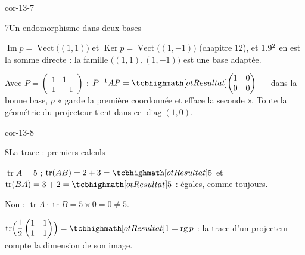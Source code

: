 \begin{blocLivre}{cor-13-7}
\begin{corrige}{7}{Un endomorphisme dans deux bases}
\begin{questions}
  \item $\operatorname{Im}p=\operatorname{Vect}\bigl((1,1)\bigr)$ et
    $\operatorname{Ker}p=\operatorname{Vect}\bigl((1,-1)\bigr)$
    (chapitre 12), et $1.9^{2}$ en est la somme directe : la famille
    $\bigl((1,1),(1,-1)\bigr)$ est une base adaptée.
  \item Avec $P=\begin{pmatrix}1&1\\1&-1\end{pmatrix}$ :
    $P^{-1}AP=\res{\begin{pmatrix}1&0\\0&0\end{pmatrix}}$ — dans la bonne
    base, $p$ « garde la première coordonnée et efface la seconde ». Toute
    la géométrie du projecteur tient dans ce $\operatorname{diag}(1,0)$.
\end{questions}
\end{corrige}
\end{blocLivre}

\begin{blocLivre}{cor-13-8}
\begin{corrige}{8}{La trace : premiers calculs}
\begin{questions}
  \item $\operatorname{tr}A=5$ ;
    $\operatorname{tr}(AB)=2+3=\res{5}$ et
    $\operatorname{tr}(BA)=3+2=\res{5}$ : égales, comme toujours.
  \item Non : $\operatorname{tr}A\cdot\operatorname{tr}B=5\times0=0\neq5$.
  \item $\operatorname{tr}\Bigl(\dfrac12\begin{pmatrix}1&1\\1&1\end{pmatrix}\Bigr)
    =\res{1}=\operatorname{rg}p$ : la trace d'un projecteur compte la
    dimension de son image.
\end{questions}
\end{corrige}
\end{blocLivre}

